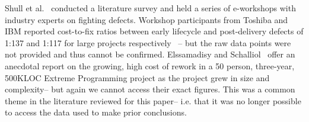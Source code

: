 \documentclass[smallcondensed]{svjour3}
\begin{document}





 

Shull et al.~\cite{Shull02} conducted a literature survey and held a series of e-workshops with industry experts on fighting defects. Workshop participants from Toshiba and IBM reported cost-to-fix ratios between early lifecycle and post-delivery defects of 1:137 and 1:117 for large projects respectively~\cite{Shull02} -- but the raw data points were not provided and thus cannot be confirmed. 
Elssamadisy and Schalliol~\cite{Elssamadisy02} offer an anecdotal report on the growing, high cost of rework in a 50 person, three-year, 500KLOC Extreme Programming project as the project grew in size and complexity-- but again we cannot access their 
exact figures. This was a common theme in the literature reviewed for this paper-- i.e.  that  it was no longer possible to access the data used to make prior conclusions. 





 
\end{document}
